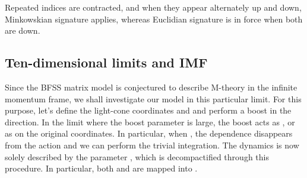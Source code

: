 \documentclass[a4paper,11pt]{article}
\begin{document}
Repeated indices are contracted, and when they appear alternately up and
down, Minkowskian signature applies, whereas Euclidian signature is in force
when both are down.

\subsection{Ten-dimensional limits and IMF}
Since the BFSS matrix model is conjectured to describe M-theory in the infinite momentum frame,
we shall investigate our model in this particular limit. For this purpose, let's define 
the light-cone coordinates \coordHE{} and \coordHE{} 
and perform a boost in the \coordHE{} direction. In the limit where the boost parameter \coordHE{} is large,
the boost acts as \coordHE{}, or as
\coordHE{} on the original coordinates.
In particular, when \coordHE{}, the \coordHE{} dependence disappears from the action
and we can perform the trivial \coordHE{} integration. The dynamics is now solely described by the parameter 
\coordHE{}, which is decompactified through this procedure. In particular, both 
\coordHE{} and \coordHE{} are mapped into \coordHE{}.
\end{document}
